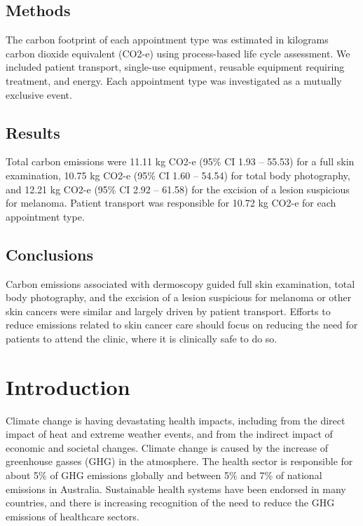 \begin{refsection}
\subsection{Methods}
The carbon footprint of each appointment type was estimated in kilograms carbon dioxide equivalent (CO2-e) using process-based life cycle assessment. We included patient transport, single-use equipment, reusable equipment requiring treatment, and energy. Each appointment type was investigated as a mutually exclusive event. 

\subsection{Results}
Total carbon emissions were 11.11 kg CO2-e (95\% CI 1.93 – 55.53) for a full skin examination, 10.75 kg CO2-e (95\% CI 1.60 – 54.54) for total body photography, and 12.21 kg CO2-e (95\% CI 2.92 – 61.58) for the excision of a lesion suspicious for melanoma. Patient transport was responsible for 10.72 kg CO2-e for each appointment type. 

\subsection{Conclusions}
Carbon emissions associated with dermoscopy guided full skin examination, total body photography, and the excision of a lesion suspicious for melanoma or other skin cancers were similar and largely driven by patient transport. Efforts to reduce emissions related to skin cancer care should focus on reducing the need for patients to attend the clinic, where it is clinically safe to do so. 

\section{Introduction}
Climate change is having devastating health impacts, including from the direct impact of heat and extreme weather events, and from the indirect impact of economic and societal changes.\cite{romanello_2024_2024} Climate change is caused by the increase of greenhouse gasses (GHG) in the atmosphere. The health sector is responsible for about 5\% of GHG emissions globally and between 5\% and 7\% of national emissions in Australia.\cite{lenzen_environmental_2020, malik_carbon_2018} Sustainable health systems have been endorsed in many countries,\cite{wise_cop26_2021} and there is increasing recognition of the need to reduce the GHG emissions of healthcare sectors.\cite{macneill_planetary_2021}


\end{refsection}
